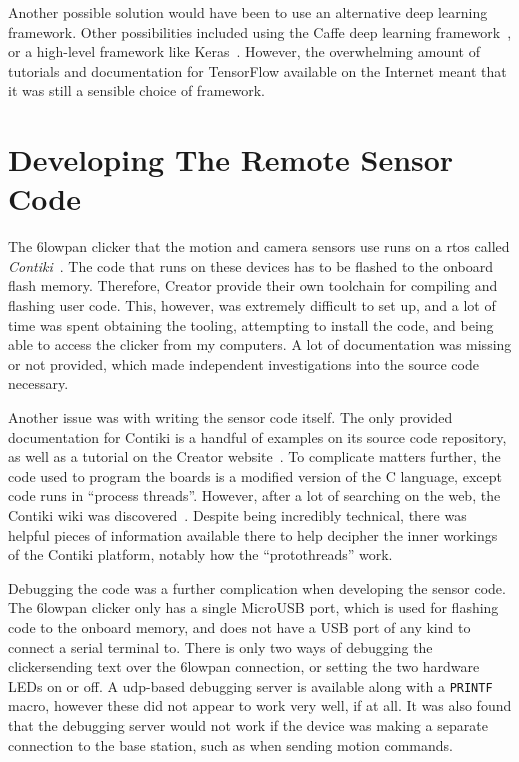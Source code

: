 Another possible solution would have been to use an alternative deep learning
framework. Other possibilities included using the Caffe deep learning
framework~\cite{jia2014caffe}, or a high-level framework like
Keras~\cite{keras}. However, the overwhelming amount of tutorials and
documentation for TensorFlow available on the Internet meant that it was
still a sensible choice of framework.

\section{Developing The Remote Sensor Code}
The \gls{6lowpan} clicker that the motion and camera sensors use runs on a
\acrfull{rtos} called \textit{Contiki}~\cite{contiki}. The code that runs on
these devices has to be flashed to the onboard flash memory. Therefore,
Creator provide their own toolchain for compiling and flashing user code.
This, however, was extremely difficult to set up, and a lot of time was spent
obtaining the tooling, attempting to install the code, and being able to
access the clicker from my computers. A lot of documentation was missing or
not provided, which made independent investigations into the source code
necessary.

Another issue was with writing the sensor code itself. The only provided
documentation for Contiki is a handful of examples on its source code
repository, as well as a tutorial on the Creator
website~\cite{clickersetupguide}. To complicate matters further, the code
used to program the boards is a modified version of the C language, except
code runs in ``process threads''. However, after a lot of searching on the
web, the Contiki wiki was discovered~\cite{contiki-wiki}. Despite being
incredibly technical, there was helpful pieces of information available there
to help decipher the inner workings of the Contiki platform, notably how the
``protothreads'' work.

Debugging the code was a further complication when developing the sensor
code. The \gls{6lowpan} clicker only has a single MicroUSB port, which is
used for flashing code to the onboard memory, and does not have a USB port of
any kind to connect a serial terminal to. There is only two ways of debugging
the clicker\textemdash{}sending text over the \gls{6lowpan} connection, or
setting the two hardware LEDs on or off. A \acrshort{udp}-based debugging
server is available along with a \texttt{PRINTF} macro, however these did not
appear to work very well, if at all. It was also found that the debugging
server would not work if the device was making a separate connection to the
base station, such as when sending motion commands.

